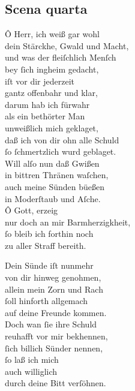 \documentclass{ees}
\newenvironment{lyrics}[1]{%
  \subsection{#1}\nopagebreak%
  \begin{lyricslist}%
  \let\voice\item%
}{%
  \end{lyricslist}%
}
\begin{document}
\begin{lyrics}{Scena quarta}
  \voice[Job]
  Ô Herr, ich weiß gar wohl\\
  dein Stärckhe, Gwald und Macht,\\
  und was der fleiſchlich Menſch\\
  bey ſich ingheim gedacht,\\
  iſt vor dir jederzeit\\
  gantz offenbahr und klar,\\
  darum hab ich fürwahr\\
  als ein bethörter Man\\
  unweißlich mich geklaget,\\
  daß ich von dir ohn alle Schuld\\
  ſo ſchmertzlich wurd geblaget.\\
  Will alſo nun daß Gwißen\\
  in bittren Thränen waſchen,\\
  auch meine Sünden büeßen\\
  in Moderſtaub und Aſche.\\
  Ô Gott, erzeig\\
  nur doch an mir Barmherzigkheit,\\
  ſo bleib ich forthin noch\\
  zu aller Straff bereith.

  \voice[Schöpffer]
  Dein Sünde iſt nunmehr\\
  von dir hinweg genohmen,\\
  allein mein Zorn und Rach\\
  ſoll hinforth allgemach\\
  auf deine Freunde kommen.\\
  Doch wan ſie ihre Schuld\\
  reuhafft vor mir bekhennen,\\
  ſich billich Sünder nennen,\\
  ſo laß ich mich\\
  auch williglich\\
  durch deine Bitt verſöhnen.
\end{lyrics}
\end{document}
